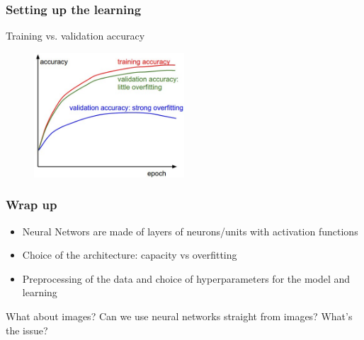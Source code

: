\begin{frame}
        \frametitle{Setting up the learning}

	Training vs. validation accuracy

     	\begin{figure}
     		\includegraphics[width=0.5\textwidth]{Pics/accuracies}\\
    	\end{figure}

\end{frame}


\begin{frame}
	\frametitle{Wrap up}

	\begin{itemize}
		\item Neural Networs are made of layers of neurons/units with activation functions
		\item Choice of the architecture: capacity vs overfitting
		\item Preprocessing of the data and choice of hyperparameters for the model and learning
	\end{itemize}

	What about images? Can we use neural networks straight from images? What's the issue?

\end{frame}















